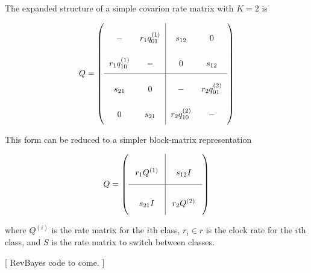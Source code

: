 The expanded structure of a simple covarion rate matrix with $K=2$ is

\begin{equation*}
Q = \left(
\arraycolsep=6pt\def\arraystretch{2.5}
\begin{array}{cc|cc}
- & r_1 q_{01}^{(1)} & s_{12} & 0 \\
r_1 q_{10}^{(1)} & - & 0 & s_{12} \\
\hline
s_{21} & 0 & - & r_2 q_{01}^{(2)} \\
0 & s_{21} & r_2 q_{10}^{(2)} & -  \\

\end{array}
\right)    
\end{equation*}

This form can be reduced to a simpler block-matrix representation

\begin{equation*}
Q = \left(
\arraycolsep=8pt\def\arraystretch{3.0}
\begin{array}{c|c}
r_1 Q^{(1)} & s_{12} I  \\
\hline
s_{21} I & r_2 Q^{(2)} \\
\end{array}
\right)
\end{equation*}


where $Q^{(i)}$ is the rate matrix for the $i$th class, $r_i \in r$ is the clock rate for the $i$th class, and $S$ is the rate matrix to switch between classes.


[ RevBayes code to come. ]

\newpage
